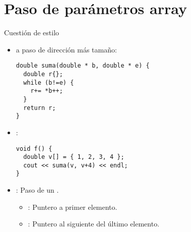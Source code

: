 \section{Paso de parámetros array}

\begin{frame}[t,fragile]{Cuestión de estilo}
\begin{itemize}
  \item {} a paso de dirección más tamaño:
\begin{lstlisting}
double suma(double * b, double * e) {
  double r{};
  while (b!=e) {
    r+= *b++;
  }
  return r;
}
\end{lstlisting}

  \item {}:
\begin{lstlisting}
void f() {
  double v[] = { 1, 2, 3, 4 };
  cout << suma(v, v+4) << endl;
}
\end{lstlisting}

  \item {}: Paso de un .
    \begin{itemize}
      \item {}: Puntero a primer elemento.
      \item {}: Puntero al siguiente del último elemento.
    \end{itemize}
\end{itemize}
\end{frame}

